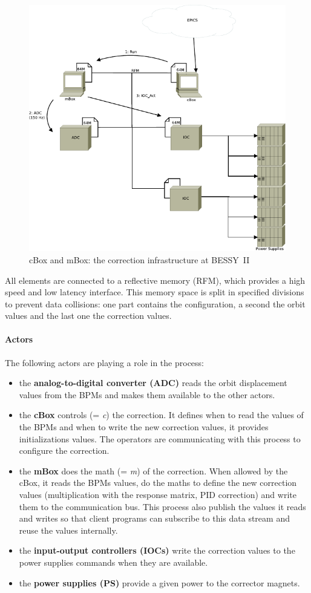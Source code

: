 \begin{figure}[!h]
    \centering
    \includegraphics[width=.85\linewidth]{img/mBox_cBox}
    \caption{\label{fig:cbox_mbox}cBox and mBox: the correction infrastructure at BESSY~II}
\end{figure}

All elements are connected to a reflective memory (RFM), which provides a high speed and low latency interface. This memory space is split in specified divisions to prevent data collisions: one part contains the configuration, a second the orbit values and the last one the correction values.

\paragraph{Actors}
The following actors are playing a role in the process:
\begin{itemize}
    \item the \textbf{analog-to-digital converter (ADC)} reads the orbit displacement values from the BPMs and makes them available to the other actors.
    \item the \textbf{cBox} controls (= \textit{c}) the correction. It defines when to read the values of the BPMs and when to write the new correction values, it provides initializations values. The operators are communicating with this process to configure the correction.
    \item the \textbf{mBox} does the math (= \textit{m}) of the correction. When allowed by the cBox, it reads the BPMs values, do the maths to define the new correction values (multiplication with the response matrix, PID correction) and write them to the communication bus. This process also publish the values it reads and writes so that client programs can subscribe to this data stream and reuse the values internally.
    \item the \textbf{input-output controllers (IOCs)} write the correction values to the power supplies commands when they are available.
    \item the \textbf{power supplies (PS)} provide a given power to the corrector magnets.
\end{itemize}

